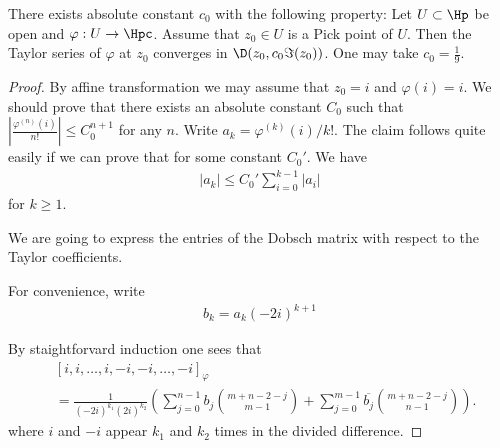 \begin{lem}
	There exists absolute constant $c_{0}$ with the following property: Let $U \subset \Hp$ be open and $\varphi : U \to \Hpc$. Assume that $z_{0} \in U$ is a Pick point of $U$. Then the Taylor series of $\varphi$ at $z_{0}$ converges in $\D(z_{0}, c_{0} \Im(z_{0}))$. One may take $c_{0} = \frac{1}{9}$.
\end{lem}
\begin{proof}
	By affine transformation we may assume that $z_{0} = i$ and $\varphi(i) = i$. We should prove that there exists an absolute constant $C_{0}$ such that $\left|\frac{\varphi^{(n)}(i)}{n!}\right| \leq C_{0}^{n + 1}$ for any $n$. Write $a_{k} = \varphi^{(k)}(i)/k!$. The claim follows quite easily if we can prove that for some constant $C_{0}'$. We have
	\begin{align*}
		|a_{k}| \leq C_{0}' \sum_{i = 0}^{k - 1} |a_{i}|
	\end{align*}
	for $k \geq 1$.

	We are going to express the entries of the Dobsch matrix with respect to the Taylor coefficients.

	For convenience, write
	\begin{align*}
		b_{k} = a_{k} (-2 i)^{k + 1}
	\end{align*}

	By staightforvard induction one sees that
	\begin{align*}
		&[i, i, \ldots, i, -i, -i, \ldots, -i]_{\varphi} \\
		&= \frac{1}{(-2i)^{k_{1}} (2 i)^{k_{2}}} \left( \sum_{j = 0}^{n - 1} b_{j} \binom{m + n - 2 - j}{m - 1} + \sum_{j = 0}^{m - 1} \overline{b_{j}} \binom{m + n - 2 - j}{n - 1}\right).
	\end{align*}
	where $i$ and $-i$ appear $k_{1}$ and $k_{2}$ times in the divided difference.


\end{proof}
